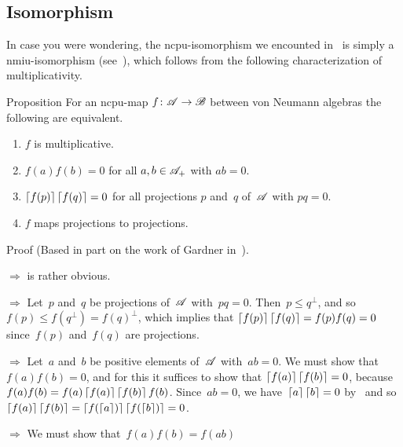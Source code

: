 \documentclass[a]{subfiles}
\begin{document}
\subsection{Isomorphism}
\begin{parsec}%
\begin{point}%
In case you were wondering,
the ncpu-isomorphism
we encounted in~
is simply a nmiu-isomorphism 
(see~), which follows
from the following characterization of multiplicativity.
\end{point}
\begin{point}[gardner]{Proposition}%
For an ncpu-map $f\colon \mathscr{A}\to\mathscr{B}$
between von Neumann algebras
the following are equivalent.
\begin{enumerate}
\item
\label{gardner-1}
$f$ is multiplicative.
\item
\label{gardner-2}
$f(a)f(b)=0$
for all $a,b\in\mathscr{A}_+$ with $ab=0$.
\item
\label{gardner-3}
$\left\lceil f(p)\right\rceil\left\lceil f(q)\right\rceil=0$
for all projections $p$ and~$q$ of~$\mathscr{A}$ with $pq=0$.
\item
\label{gardner-4}
$f$ maps projections to projections.
\end{enumerate}
\begin{point}{Proof}%
(Based in part on the work of Gardner in~\cite{gardner}).
\begin{point}{$\Longrightarrow$}%
	is rather obvious.
\end{point}
\begin{point}{$\Longrightarrow$}%
Let~$p$ and~$q$ be projections of~$\mathscr{A}$ with~$pq=0$.
Then~$p\leq q^\perp$, and so~$f(p)\leq f(q^\perp)=f(q)^\perp$,
which implies that $\left\lceil f(p)\right\rceil\left\lceil f(q)\right\rceil
=f(p)f(q)=0$ since~$f(p)$ and~$f(q)$ are projections.
\end{point}
\begin{point}{$\Longrightarrow$}%
Let~$a$ and~$b$ be positive elements of~$\mathscr{A}$ with~$ab=0$.
We must show that~$f(a)f(b)=0$,
and for this it suffices to show that
$\left\lceil f(a)\right\rceil\left\lceil f(b)\right\rceil=0$,
because $f(a)f(b)=f(a)\left\lceil f(a)\right\rceil\left\lceil f(b)\right\rceil f(b)$.
Since~$ab=0$,
we have~$\left\lceil a\right\rceil\left\lceil b\right\rceil=0$ by~
and so $\left\lceil f(a)\right\rceil\left\lceil f(b)\right\rceil=\left\lceil f(\left\lceil a\right\rceil)\right\rceil\left\lceil f(\left\lceil b\right\rceil)\right\rceil=0$.
\end{point}
\begin{point}{$\Longrightarrow$}%
We must show that~$f(a)f(b)=f(ab)$

\end{point}
\end{point}
\end{point}
\end{parsec}
\end{document}
